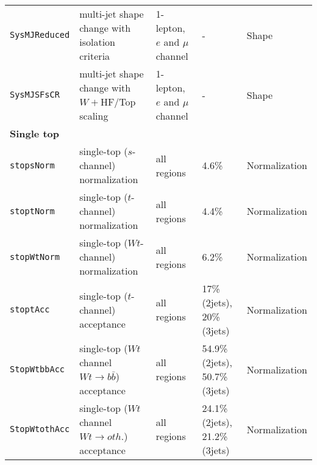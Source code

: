 \begin{table}
{\begin{tabular}{lllll}
      \texttt{SysMJReduced} & multi-jet shape change with isolation criteria & 1-lepton, $e$ and $\mu$ channel & - & Shape \\
      \texttt{SysMJSFsCR} & multi-jet shape change with $W +$HF/Top scaling & 1-lepton, $e$ and $\mu$ channel & - & Shape \\
      {\bfseries Single top}&&&&\\
      \texttt{stopsNorm}    & single-top ($s$-channel) normalization 	&  all regions	& 4.6\%	&Normalization\\
      \texttt{stoptNorm}    & single-top ($t$-channel) normalization 	&  all regions	& 4.4\%	&Normalization\\
      \texttt{stopWtNorm}   & single-top ($Wt$-channel) normalization &  all regions	& 6.2\%	&Normalization\\
      \texttt{stoptAcc}     & single-top ($t$-channel) acceptance 	&  all regions & 17\% (2jets), 20\% (3jets)	&Normalization\\
      \texttt{StopWtbbAcc} 	& single-top ($Wt$ channel $Wt\rightarrow b\bar{b}$) acceptance &  all regions	& 54.9\% (2jets), 50.7\% (3jets)	&Normalization\\
      \texttt{StopWtothAcc} 	& single-top ($Wt$ channel $Wt\rightarrow oth.$) acceptance &  all regions	& 24.1\% (2jets), 21.2\% (3jets)	&Normalization\\

\end{tabular}}
\end{table}
